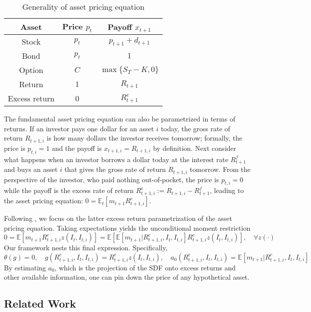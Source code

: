 \begin{table}[H]
       \centering
       \begin{tabular}{|c||c|c|}
        \hline 
            Asset & Price $p_t$ & Payoff $x_{t+1}$ \\
             \hline 
            \hline
            Stock &$p_t$& $p_{t+1}+d_{t+1}$ \\
              Bond &$p_t$&$1$\\
             Option &$C$&$\max\{S_T-K,0\}$ \\
             \hline 
            Return & $1$& $R_{t+1}$ \\
            Excess return &0&$R^e_{t+1}$ \\
            \hline 
       \end{tabular}
       \caption{Generality of asset pricing equation}
       \label{tab:my_label}
   \end{table}
 
 The fundamental asset pricing equation can also be parametrized in terms of returns. If an investor pays one dollar for an asset $i$ today, the gross rate of return $R_{t+1,i}$ is how many dollars the investor receives tomorrow; formally, the price is $p_{t,i}=1$ and the payoff is $x_{t+1,i}=R_{t+1,i}$ by definition. Next consider what happens when an investor borrows a dollar today at the interest rate $R_{t+1}^f$ and buys an asset $i$ that gives the gross rate of return $R_{t+1,i}$ tomorrow. From the perspective of the investor, who paid nothing out-of-pocket, the price is $p_{t,i}=0$ while the payoff is the excess rate of return $R_{t+1,i}^e:=R_{t+1,i}-R_{t+1}^f$, leading to the asset pricing equation: $0=\mathbb{E}_t[m_{t+1}R^e_{t+1,i}]$.
 
 
 Following \cite{chen2019deep}, we focus on the latter excess return parametrization of the asset pricing equation. Taking expectations yields the unconditional moment restriction
$$
0=\mathbb{E}[m_{t+1}R^e_{t+1,i}z(I_t,I_{t,i})]=\mathbb{E}[\mathbb{E}[m_{t+1}|R^e_{t+1,i},I_t,I_{t,i}]R^e_{t+1,i}z(I_t,I_{t,i})],\quad \forall z(\cdot)
$$
Our framework nests this final expression. Specifically,
$$
\theta(g)=0,\quad g(R^e_{t+1,i},I_t,I_{t,i})=R^e_{t+1,i}z(I_t,I_{t,i}),\quad a_0(R^e_{t+1,i},I_t,I_{t,i})=\mathbb{E}[m_{t+1}|R^e_{t+1,i},I_t,I_{t,i}]
$$
By estimating $a_0$, which is the projection of the SDF onto excess returns and other available information, one can pin down the price of any hypothetical asset. 

%
%
%
%

\subsection{Related Work}


